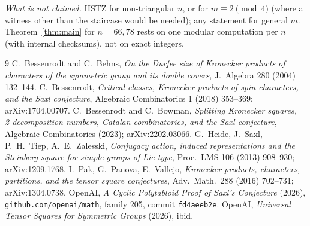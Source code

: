 \documentclass[11pt]{amsart}
\theoremstyle{remark}
\begin{document}
\emph{What is not claimed.} HSTZ for non-triangular $n$, or for $m\equiv2\pmod4$ (where a
witness other than the staircase would be needed); any statement for general $m$.
Theorem~\ref{thm:main} for $n=66,78$ rests on one modular computation per $n$ (with internal
checksums), not on exact integers.

\begin{thebibliography}{9}
 C.~Bessenrodt and C.~Behns, \emph{On the Durfee size of Kronecker products of
characters of the symmetric group and its double covers}, J.~Algebra 280 (2004) 132--144.
 C.~Bessenrodt, \emph{Critical classes, Kronecker products of spin characters,
and the Saxl conjecture}, Algebraic Combinatorics 1 (2018) 353--369; arXiv:1704.00707.
 C.~Bessenrodt and C.~Bowman, \emph{Splitting Kronecker squares, 2-decomposition
numbers, Catalan combinatorics, and the Saxl conjecture}, Algebraic Combinatorics (2023);
arXiv:2202.03066.
 G.~Heide, J.~Saxl, P.~H.~Tiep, A.~E.~Zalesski, \emph{Conjugacy action, induced
representations and the Steinberg square for simple groups of Lie type}, Proc.\ LMS 106
(2013) 908--930; arXiv:1209.1768.
 I.~Pak, G.~Panova, E.~Vallejo, \emph{Kronecker products, characters, partitions,
and the tensor square conjectures}, Adv.\ Math.\ 288 (2016) 702--731; arXiv:1304.0738.
 OpenAI, \emph{A Cyclic Polytabloid Proof of Saxl's Conjecture} (2026),
\texttt{github.com/openai/math}, family 205, commit \texttt{fd4aeeb2e}.
 OpenAI, \emph{Universal Tensor Squares for Symmetric Groups} (2026), ibid.
\end{thebibliography}
\end{document}
